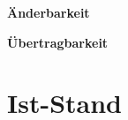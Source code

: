 \textbf{Änderbarkeit}\\
\begin{description}
\item[] 
\item[] 
\item[] 
\item[] 
\item[] 
\item[] 
\item[] 
\end{description}

\textbf{Übertragbarkeit}\\
\begin{description}
\item[] 
\item[] 
\item[] 
\item[] 
\item[] 
\item[] 
\item[] 
\end{description}

\section{Ist-Stand}

